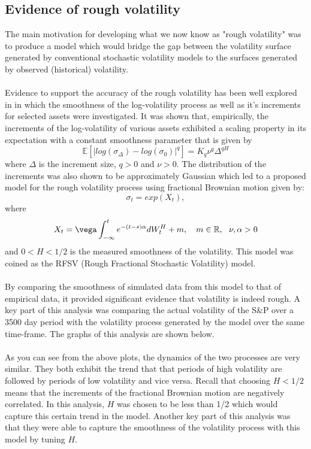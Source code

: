 \documentclass[12pt,oneside]{article}
\begin{document}
\subsection{Evidence of rough volatility}
\label{sec:rough_vol_evidence}
The main motivation for developing what we now know as "rough volatility" was to produce a model which would bridge the gap between the volatility surface generated by conventional stochastic volatility models to the surfaces generated by observed (historical) volatility. 
\\
\\
Evidence to support the accuracy of the rough volatility  has been well explored in \cite{BlackScholesOR, Gatheral2014} in which the smoothness of the log-volatility process as well as it's increments for selected assets were investigated. It was shown that, empirically, the increments of the log-volatility of various assets exhibited a scaling property in its expectation with a constant smoothness parameter that is given by $$\mathbb{E}[|log(\sigma_\Delta)-log(\sigma_0)|^q]=K_q\nu^q\Delta^{qH}$$ where $\Delta$ is the increment size, $q>0$ and $\nu>0$. The distribution of the increments was also shown to be approximately Gaussian which led to a proposed model for the rough volatility process using fractional Brownian motion given by: $$\sigma_t = exp(X_t),$$ where $$X_t=\vega\int_{-\infty}^t e^{-(t-s)\alpha}dW_t^H+m, \ \ \ m\in\mathbb{R}, \ \  \nu, \alpha>0$$ and $0<H<1/2$ is the measured smoothness of the volatility. This model was coined as the RFSV (Rough Fractional Stochastic Volatility) model. 
\\
\\
By comparing the smoothness of simulated data from this model to that of empirical data, it provided significant evidence that volatility is indeed rough. A key part of this analysis was comparing the actual volatility of the S\&P over a 3500 day period with the volatility process generated by the model over the same time-frame. The graphs of this analysis are shown below.
\\
\\
As you can see from the above plots, the dynamics of the two processes are very similar. They both exhibit the trend that that periods of high volatility are followed by periods of low volatility and vice versa. Recall that choosing $H<1/2$ means that the increments of the fractional Brownian motion are negatively correlated. In this analysis, $H$ was chosen to be less than 1/2 which would capture this certain trend in the model. Another key part of this analysis was that they were able to capture the smoothness of the volatility process with this model by tuning $H$. 
\end{document}

